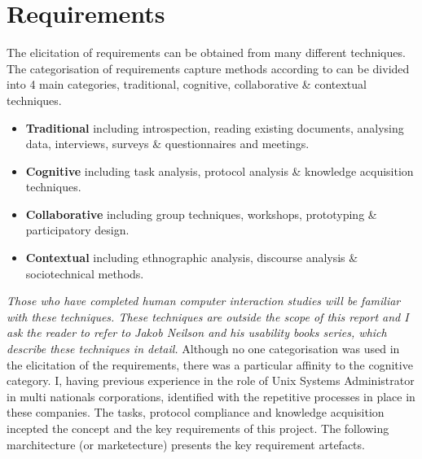 \vspace{-3mm}
\section{Requirements}	

	\normalsize
	{		
		The elicitation of requirements can be obtained from many different techniques.
		The categorisation of requirements capture methods according to \citet{Goguen} can be divided into 4 main categories,
		traditional, cognitive, collaborative \& contextual techniques.	

		\vspace{-3mm}
		\begin{multicols}{2}
		
			\begin{itemize}
				\item \textbf{Traditional} 
					\newline
					including introspection, reading existing documents, analysing data,
					interviews, surveys \& questionnaires and meetings.
				\item \textbf{Cognitive}	
					\newline
					including task analysis, protocol analysis \& knowledge acquisition techniques.
		
		\vfill
		\columnbreak
		
				\item \textbf{Collaborative}	
					\newline
					including group techniques, workshops, prototyping \& participatory design.					
				\item \textbf{Contextual}	
					\newline
					including ethnographic analysis, discourse analysis \& sociotechnical methods.
					\newline
			\end{itemize}
		
		\end{multicols}	

		\textit{Those who have completed human computer interaction studies will be familiar with these techniques.
		These techniques are outside the scope of this report and I ask the reader to refer to Jakob Neilson 
		and his usability books series, which describe these techniques in detail.}
		\newline
		\newline
		Although no one categorisation was used in the elicitation of the requirements, there was a particular affinity
		to the cognitive category.  I, having previous experience in the role of Unix Systems Administrator in multi nationals corporations,
		identified with the repetitive processes in place in these companies. The tasks, protocol compliance and knowledge acquisition  
		incepted the concept and the key requirements of this project.  The following marchitecture (or marketecture) presents the key requirement artefacts.		
	}
	
